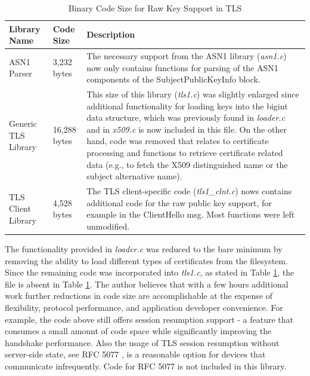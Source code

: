 \documentclass[a4paper, 10pt]{IEEEtran}
\begin{document}
\begin{table}[htdp]
\caption{Binary Code Size for Raw Key Support in TLS}
\begin{center}
\begin{tabular}{|p{1cm}|p{}|p{}|}
\hline
\textbf{Library Name} & \textbf{Code Size} & \textbf{Description} \\
\hline\hline
ASN1 Parser & 3,232 bytes & The necessary support from the ASN1 library (\textit{asn1.c}) now only contains functions for parsing of the ASN1 components of the SubjectPublicKeyInfo block.\\ 
\hline\hline
Generic TLS Library & 16,288 bytes & This size of this library (\textit{tls1.c}) was slightly enlarged since additional functionality for loading keys into the bigint data structure, which was previously found in \textit{loader.c} and in \textit{x509.c} is now included in this file. On the other hand, code was removed that relates to certificate processing and functions to retrieve certificate related data (e.g., to fetch the X509 distinguished name or the subject alternative name).\\ 
\hline\hline
TLS Client Library & 4,528 bytes & The TLS client-specific code (\textit{tls1\_clnt.c}) nows contains additional code for the raw public key support, for example in the ClientHello msg. Most functions were left unmodified. \\ 
\hline
\end{tabular}
\end{center}
\label{tls-raw-code-table}
\end{table}

The functionality provided in \textit{loader.c} was reduced to the bare minimum by removing the ability to load different types of certificates from the filesystem. Since the remaining code was incorporated into \textit{tls1.c}, as stated in Table \ref{tls-raw-code-table}, the file is absent in Table \ref{tls-raw-code-table}. The author believes that with a few hours additional work further reductions in code size are accomplishable at the expense of flexibility, protocol performance, and application developer convenience. For example, the code above still offers session resumption support - a feature that consumes a small amount of code space while significantly improving the handshake performance. Also the usage of TLS session resumption without server-side state, see RFC 5077 \cite{rfc5077}, is a reasonable option for devices that communicate infrequently. Code for RFC 5077 is not included in this library.
\end{document}
